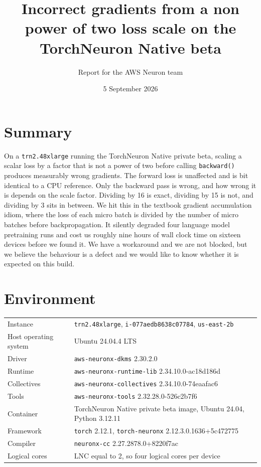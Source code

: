 \documentclass[11pt,a4paper]{article}
\title{Incorrect gradients from a non power of two loss scale on the\\
TorchNeuron Native beta}
\author{Report for the AWS Neuron team}
\date{5 September 2026}
\newcommand{\code}[1]{\texttt{\small #1}}
\begin{document}
\maketitle

\section*{Summary}

On a \code{trn2.48xlarge} running the TorchNeuron Native private beta, scaling a
scalar loss by a factor that is not a power of two before calling
\code{backward()} produces measurably wrong gradients. The forward loss is
unaffected and is bit identical to a CPU reference. Only the backward pass is
wrong, and how wrong it is depends on the scale factor. Dividing by 16 is exact,
dividing by 15 is not, and dividing by 3 sits in between. We hit this in the
textbook gradient accumulation idiom, where the loss of each micro batch is
divided by the number of micro batches before backpropagation. It silently
degraded four language model pretraining runs and cost us roughly nine hours of
wall clock time on sixteen devices before we found it. We have a workaround and
we are not blocked, but we believe the behaviour is a defect and we would like to
know whether it is expected on this build.

\section{Environment}

\begin{tabular}{@{}ll@{}}
\toprule
Instance & \code{trn2.48xlarge}, \code{i-077aedb8638c07784}, \code{us-east-2b} \\
Host operating system & Ubuntu 24.04.4 LTS \\
Driver & \code{aws-neuronx-dkms} 2.30.2.0 \\
Runtime & \code{aws-neuronx-runtime-lib} 2.34.10.0-ac18d186d \\
Collectives & \code{aws-neuronx-collectives} 2.34.10.0-74eaafac6 \\
Tools & \code{aws-neuronx-tools} 2.32.28.0-526c2b7f6 \\
Container & TorchNeuron Native private beta image, Ubuntu 24.04, Python 3.12.11 \\
Framework & \code{torch} 2.12.1, \code{torch-neuronx} 2.12.3.0.1636+5c472775 \\
Compiler & \code{neuronx-cc} 2.27.2878.0+8220f7ac \\
Logical cores & LNC equal to 2, so four logical cores per device \\
\bottomrule
\end{tabular}
\end{document}
